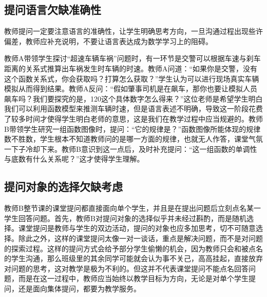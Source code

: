 \subsection{提问语言欠缺准确性}

教师提问一定要注意语言的准确性，让学生明确思考方向，一旦沟通过程出现些许偏差，教师应补充说明，不要让语言表达成为数学学习上的阻碍。

教师A带领学生探讨“超速车辆车祸”问题时，有一环节是交警可以根据车速与刹车距离的关系式推算出车祸发生时车辆的时速。教师A问道：“如果你是交警，没有这个函数关系式，你会获取吗？打算怎么获取？”学生认为可以进行现场真实车辆模拟从而得到结果。教师A反问：“假如肇事司机是在飙车，那你也要让模拟人员飙车吗？我们要探究的是，120这个具体数字怎么得来？”这位老师是希望学生明白我们可以利用函数模型来推测车辆时速，但是语言表述不明确，导致这一阶段花费了较多时间才使得学生明白老师的意思，这是我们在教学过程中应当规避的。教师B带领学生研究一组函数图像时，提问：“它的规律是？”函数图像所能体现的规律数不胜数，学生根本不知道教师问的是哪一方面的规律，也就无人作答，课堂气氛一下子冷却下来。教师B意识到这一点后，及时补充提问：“这一组函数的单调性与底数有什么关系呢？”这才使得学生理解。


\subsection{提问对象的选择欠缺考虑}

教师B整节课的课堂提问都直接面向单个学生，并且是在提出问题后立刻点名某一学生回答问题。首先，教师B对提问对象的选择似乎并未经过斟酌，而是随机选择。课堂提问是教师与学生的双边活动，提问的对象也应多加思考，切不可随意选择。除此之外，这样的课堂提问太像一对一谈话，重点是解决问题，而不是对问题的探索过程。这样的提问方式会给予部分学生偷懒的机会，因为教师只会和被点名的学生沟通，那么班级里的其余同学可能就会认为事不关己，高高挂起，直接放弃对问题的思考，这对教学是极为不利的。但这并不代表课堂提问不能点名回答问题，而是在这一过程中，教师应当始终以教学目标为方向，无论是对单个学生提问，还是面向集体提问，都要为教学服务。
